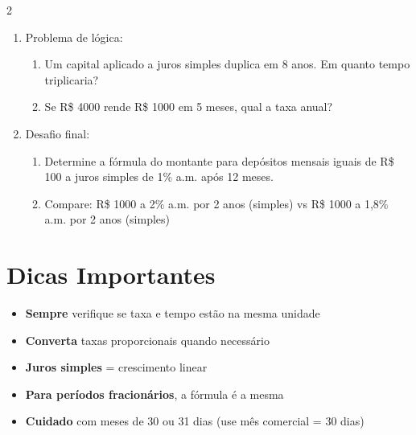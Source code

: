 \documentclass[11pt]{article}
\begin{document}
\begin{multicols}{2}
\begin{enumerate}[leftmargin=*, start=9]
\item Problema de lógica:
\begin{enumerate}[label=\alph*)]
\item Um capital aplicado a juros simples duplica em 8 anos.
  Em quanto tempo triplicaria?
\item Se R\$ 4000 rende R\$ 1000 em 5 meses, qual a taxa anual?
\end{enumerate}

\item Desafio final:
\begin{enumerate}[label=\alph*)]
\item Determine a fórmula do montante para depósitos mensais iguais de R\$ 100 a juros simples de 1\% a.m. após 12 meses.
\item Compare: R\$ 1000 a 2\% a.m. por 2 anos (simples) vs R\$ 1000 a 1,8\% a.m. por 2 anos (simples)
\end{enumerate}

\end{enumerate}

\section*{Dicas Importantes}

\begin{itemize}
\item \textbf{Sempre} verifique se taxa e tempo estão na mesma unidade
\item \textbf{Converta} taxas proporcionais quando necessário
\item \textbf{Juros simples} = crescimento linear
\item \textbf{Para períodos fracionários}, a fórmula é a mesma
\item \textbf{Cuidado} com meses de 30 ou 31 dias (use mês comercial = 30 dias)
\end{itemize}

\end{multicols}
\end{document}
